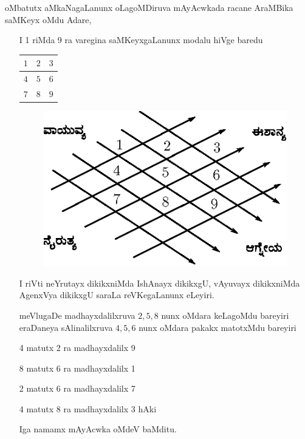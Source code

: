oMbatutx aMkaNagaLanunx oLagoMDiruva mAyAcwkada racane AraMBika saMKeyx oMdu Adare,

\begin{enumerate}
\item[{\rm I}] {\rm 1} riMda {\rm 9} ra varegina saMKeyxgaLanunx modalu hiVge baredu

\begin{center}
\begin{tabular}{|>{$}c<{$}|>{$}c<{$}|>{$}c<{$}|}
\hline
1 & 2 & 3\\
\hline
4 & 5 & 6\\
\hline
7 & 8 & 9\\
\hline
\end{tabular}
\end{center}

\begin{figure}[H]
\centering
\includegraphics[scale=.8]{src/figures/m_116.eps}
\end{figure}

I riVti neYrutayx dikikxniMda IshAnayx dikikxgU, vAyuvayx dikikxniMda AgenxVya dikikxgU saraLa reVKegaLanunx eLeyiri.

meVlugaDe madhayxdalilxruva $2, 5, 8$ nunx oMdara keLagoMdu bareyiri eraDaneya sAlinalilxruva $4, 5, 6$ nunx oMdara pakakx matotxMdu bareyiri

{\rm 4} matutx {\rm 2} ra madhayxdalilx {\rm 9}

{\rm 8} matutx {\rm 6} ra madhayxdalilx {\rm 1}

{\rm 2} matutx {\rm 6} ra madhayxdalilx {\rm 7}

{\rm 4} matutx {\rm 8} ra madhayxdalilx {\rm 3} hAki

Iga namamx mAyAcwka oMdeV baMditu.

\begin{center}
%
\end{center}


\end{enumerate}
